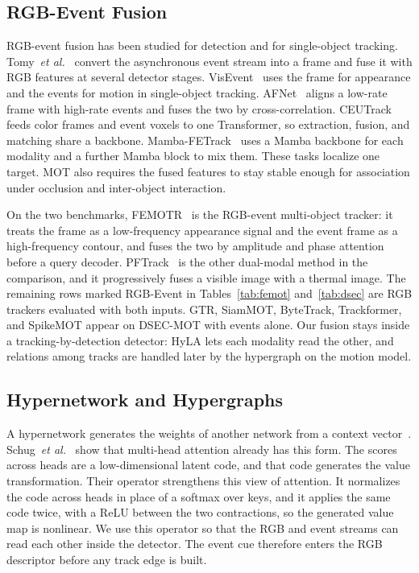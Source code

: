 \documentclass[10pt,twocolumn,letterpaper]{article}
\begin{document}
\subsection{RGB-Event Fusion}

RGB-event fusion has been studied for detection and for single-object tracking. Tomy~\emph{et al.}~\cite{tomy2022fusion} convert the asynchronous event stream into a frame and fuse it with RGB features at several detector stages. VisEvent~\cite{wang2024visevent} uses the frame for appearance and the events for motion in single-object tracking. AFNet~\cite{zhang2023afnet} aligns a low-rate frame with high-rate events and fuses the two by cross-correlation. CEUTrack~\cite{tang2026ceutrack} feeds color frames and event voxels to one Transformer, so extraction, fusion, and matching share a backbone. Mamba-FETrack~\cite{huang2024mambafetrack} uses a Mamba backbone for each modality and a further Mamba block to mix them. These tasks localize one target. MOT also requires the fused features to stay stable enough for association under occlusion and inter-object interaction.

On the two benchmarks, FEMOTR~\cite{wang2026femot} is the RGB-event multi-object tracker: it treats the frame as a low-frequency appearance signal and the event frame as a high-frequency contour, and fuses the two by amplitude and phase attention before a query decoder. PFTrack~\cite{zhu2025pftrack} is the other dual-modal method in the comparison, and it progressively fuses a visible image with a thermal image. The remaining rows marked RGB-Event in Tables~\ref{tab:femot} and~\ref{tab:dsec} are RGB trackers evaluated with both inputs. GTR, SiamMOT, ByteTrack, Trackformer, and SpikeMOT appear on DSEC-MOT with events alone. Our fusion stays inside a tracking-by-detection detector: HyLA lets each modality read the other, and relations among tracks are handled later by the hypergraph on the motion model.

\subsection{Hypernetwork and Hypergraphs}

A hypernetwork generates the weights of another network from a context vector~\cite{ha2017hypernetworks}. Schug~\emph{et al.}~\cite{schug2025hyla} show that multi-head attention already has this form. The scores across heads are a low-dimensional latent code, and that code generates the value transformation. Their operator strengthens this view of attention. It normalizes the code across heads in place of a softmax over keys, and it applies the same code twice, with a ReLU between the two contractions, so the generated value map is nonlinear. We use this operator so that the RGB and event streams can read each other inside the detector. The event cue therefore enters the RGB descriptor before any track edge is built.
\end{document}

